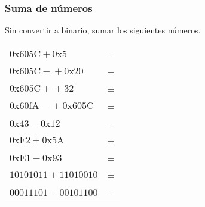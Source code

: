 \subsubsection{Suma de números}
Sin convertir a binario, sumar los siguientes números.

\begin{tabular}{lc}
  $\mathrm{0x605C} + \mathrm{0x5} $&=\underspace\\
  $\mathrm{0x605C -} + \mathrm{0x20} $&=\underspace\\
  $\mathrm{0x605C +} + \mathrm{32} $&=\underspace\\
  $\mathrm{0x60fA -} + \mathrm{0x605C} $&=\underspace\\
  $\mathrm{0x43} - \mathrm{0x12}$&=\underspace\\
  $\mathrm{0xF2} + \mathrm{0x5A}$&=\underspace\\
  $\mathrm{0xE1} - \mathrm{0x93}$&=\underspace\\
  $\mathrm{10101011} + \mathrm{11010010}$&=\underspace\\
  $\mathrm{00011101} - \mathrm{00101100}$&=\underspace\\
\end{tabular}

